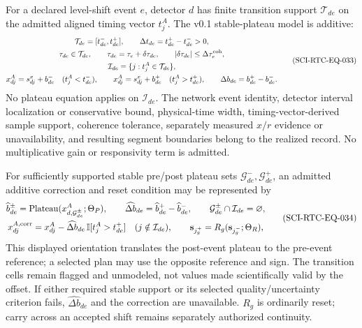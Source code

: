 For a declared level-shift event $e$, detector $d$ has finite transition
support $\mathcal T_{de}$ on the admitted aligned timing vector $t^A_j$.  The
v0.1 stable-plateau model is additive:
\begin{equation}
 \begin{gathered}
 \mathcal T_{de}=[t^-_{de},t^+_{de}],\qquad
 \Delta t_{de}=t^+_{de}-t^-_{de}>0,\\
 \tau_{de}\in\mathcal T_{de},\qquad
 \tau_{de}=\tau_e+\delta\tau_{de},\qquad
 |\delta\tau_{de}|\le\Delta\tau^{\rm coh}_e,\\
 \mathcal I_{de}=\{j:t^A_j\in\mathcal T_{de}\},\\
 x^A_{dj}=s^x_{dj}+b^-_{de}\quad(t^A_j<t^-_{de}),\qquad
 x^A_{dj}=s^x_{dj}+b^+_{de}\quad(t^A_j>t^+_{de}),\qquad
 \Delta b_{de}=b^+_{de}-b^-_{de}.
 \end{gathered}
 \tag{SCI-RTC-EQ-033}\label{eq:level-shift}
\end{equation}
No plateau equation applies on $\mathcal I_{de}$.  The network event identity,
detector interval localization or conservative bound, physical-time width,
timing-vector-derived sample support, coherence tolerance, separately measured
$x/r$ evidence or unavailability, and resulting segment boundaries belong to
the realized record.  No multiplicative gain or responsivity term is admitted.

For sufficiently supported stable pre/post plateau sets
$\mathcal G^-_{de},\mathcal G^+_{de}$, an admitted additive correction and
reset condition may be represented by
\begin{equation}
 \begin{gathered}
 \widehat b^{\pm}_{de}=\operatorname{Plateau}
   (x^A_{d,\mathcal G^{\pm}_{de}};\Theta_P),\qquad
 \widehat{\Delta b}_{de}=\widehat b^+_{de}-\widehat b^-_{de},
 \qquad \mathcal G^{\pm}_{de}\cap\mathcal I_{de}=\varnothing,\\
 x^{A,\rm corr}_{dj}=x^A_{dj}-\widehat{\Delta b}_{de}\,
   \mathbb I[t^A_j>t^+_{de}]\quad(j\notin\mathcal I_{de}),\qquad
 \mathbf s_{j_g^+}=R_g(\mathbf s_{j_g^-};\Theta_R),
 \end{gathered}
 \tag{SCI-RTC-EQ-034}\label{eq:plateau-reset}
\end{equation}
This displayed orientation translates the post-event plateau to the pre-event
reference; a selected plan may use the opposite reference and sign.  The
transition cells remain flagged and unmodeled, not values made scientifically
valid by the offset.  If either required stable support or its selected
quality/uncertainty criterion fails, $\widehat{\Delta b}_{de}$ and the
correction are unavailable.  $R_g$ is ordinarily reset; carry across an
accepted shift remains separately authorized continuity.

